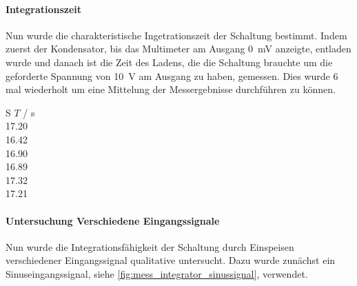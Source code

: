 \documentclass[12pt,english,ngerman]{scrartcl}
\begin{document}
\paragraph{Integrationszeit}
Nun wurde die charakteristische Ingetrationszeit der Schaltung bestimmt. Indem
zuerst der Kondensator, bis das Multimeter am Ausgang \SI{0}{\mV} anzeigte,
entladen wurde und danach ist die Zeit des Ladens, die die Schaltung brauchte
um die geforderte Spannung von \SI{10}{\volt} am Ausgang zu haben, gemessen.
Dies wurde 6 mal wiederholt um eine Mittelung der Messergebnisse durchführen zu
können.

\begin{table}
  \caption{Messungen der Integrationszeit der realen Schaltung aus
  \autoref{fig:sim_integrator_schaltung}, wobei $T$ die Ladezeit bis am Ausgang
  \SI{10}{\volt} anliegt. Bei einem Ladespannung \SI{91.8}{\milli\volt}, einem
  Widerstand von \SI{21.9}{\kilo\ohm} und einer Kapazität von
  \SI{6.8}{\micro\farad} }
  \label{tab:messungen_integration}
  \centering
  \begin{tabular}[c]{S}
    {$T$ / \si{\second}} \\
    17.20 \\
    16.42 \\
    16.90 \\
    16.89 \\
    17.32 \\
    17.21 \\
  \end{tabular}
\end{table}


\paragraph{Untersuchung Verschiedene Eingangssignale}
Nun wurde die Integrationsfähigkeit der Schaltung durch Einspeisen
verschiedener Eingangssignal qualitative untersucht. Dazu wurde zunächst ein
Sinuseingangssignal, siehe \autoref{fig:mess_integrator_sinussignal}, verwendet.
 
\end{document}
